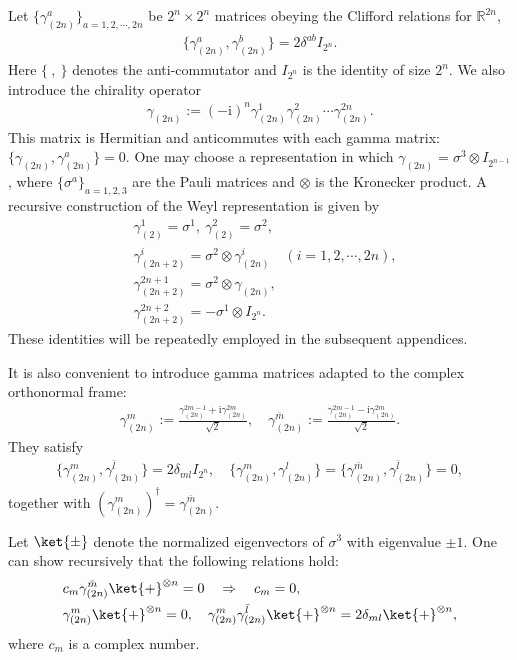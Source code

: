 \documentclass[12pt]{article}
\newcommand{\im}{\mathrm{i}}
\newcommand\als[1]{\begin{align}\begin{split}#1\end{split}\end{align}}
\theoremstyle{definition} %
\theoremstyle{plain} %
\theoremstyle{remark} %
\theoremstyle{underline}
\begin{document}
Let $\{\gamma^a_{(2n)}\}_{a=1,2,\cdots,2n}$ be $2^n\times 2^n$ matrices obeying
the Clifford relations for $\mathbb{R}^{2n}$,
\begin{align}
    \{\gamma^a_{(2n)}, \gamma^b_{(2n)}\} = 2 \delta^{ab} I_{2^n}.
\end{align}
Here $\{\ ,\ \}$ denotes the anti-commutator and $I_{2^n}$ is the identity of
size $2^n$.
We also introduce the chirality operator
\begin{align}
    \gamma_{(2n)} := (-\im)^n \gamma^1_{(2n)}\gamma^2_{(2n)} \cdots \gamma^{2n}_{(2n)}.
\end{align}
This matrix is Hermitian and anticommutes with each gamma matrix:
$\{\gamma_{(2n)},\gamma^a_{(2n)}\}=0$.
One may choose a representation in which
$\gamma_{(2n)}=\sigma^3\otimes I_{2^{n-1}}$, where $\{\sigma^a\}_{a=1,2,3}$ are
the Pauli matrices and $\otimes$ is the Kronecker product.
A recursive construction of the Weyl representation is given by
\begin{align}
\label{recursion}
&\gamma_{(2)}^1 = \sigma^1, \ \gamma_{(2)}^2 = \sigma^2, \\
&\gamma_{(2n+2)}^i =\sigma^2  \otimes \gamma_{(2n)}^i \quad (i=1,2,\cdots,2n),\\
&\gamma_{(2n+2)}^{2n+1} = \sigma^2 \otimes \gamma_{(2n)}, \\
&\gamma_{(2n+2)}^{2n+2} = - \sigma^1 \otimes I_{2^{n}}.
\end{align}
These identities will be repeatedly employed in the subsequent appendices.

It is also convenient to introduce gamma matrices adapted to the complex
orthonormal frame:
\begin{align}
    \gamma_{(2n)}^m := \frac{\gamma_{(2n)}^{2m-1} + \im \gamma_{(2n)}^{2m}}{\sqrt{2}}, \quad \gamma_{(2n)}^{\bar m} := \frac{\gamma_{(2n)}^{2m-1} - \im  \gamma_{(2n)}^{2m}}{\sqrt{2}}.
\end{align}
They satisfy
\begin{align}
    \{\gamma_{(2n)}^m,\gamma_{(2n)}^{\bar l} \} = 2\delta_{ml} I_{2^n}, \quad \{\gamma_{(2n)}^m,\gamma_{(2n)}^l \} = \{\gamma_{(2n)}^{\bar m},\gamma_{(2n)}^{\bar l} \} = 0,
\end{align}
together with $(\gamma_{(2n)}^m)^{\dagger} = \gamma_{(2n)}^{\bar m}$.

Let $\ket{\pm}$ denote the normalized eigenvectors of $\sigma^3$ with eigenvalue
$\pm 1$.
One can show recursively that the following relations hold:
\als{ \label{gamma matrices identities}
&c_m \gamma_{(2n)}^{\bar{m}}\ket{+}^{\otimes n} = 0 \quad \Rightarrow \quad c_m = 0,\\
&\gamma_{(2n)}^{m} \ket{+}^{\otimes n} = 0, \quad \gamma_{(2n)}^m \gamma_{(2n)}^{\bar l} \ket{+}^{\otimes n} = 2\delta_{ml}\ket{+}^{\otimes n},
}
where $c_m$ is a complex number.
\end{document}
